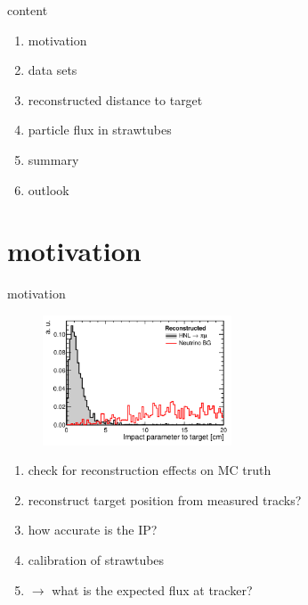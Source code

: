 



\maketitle


\begin{frame}[t]{content}
  \begin{enumerate} \setlength\itemsep{0.5cm}
    \item {\Large motivation}
    \item {\Large data sets}
    \item {\Large reconstructed distance to target}
    \item {\Large particle flux in strawtubes}
    \item {\Large summary}
    \item {\Large outlook}
  \end{enumerate}
\end{frame}

\section{motivation}

\begin{frame}[t]{motivation}
  \begin{multicols}{2}
    \begin{figure}
      \centering
      \includegraphics[width=0.5\textwidth]{IP_cut.png}
    \end{figure}
    \columnbreak
    \vspace*{\fill}
      \begin{enumerate}
        \item check for reconstruction effects on MC truth
        \item reconstruct target position from measured tracks?
        \item how accurate is the IP?
        \item calibration of strawtubes
        \item $\rightarrow$ what is the expected flux at tracker?
      \end{enumerate}
    \vspace*{\fill}
  \end{multicols}
\end{frame}

